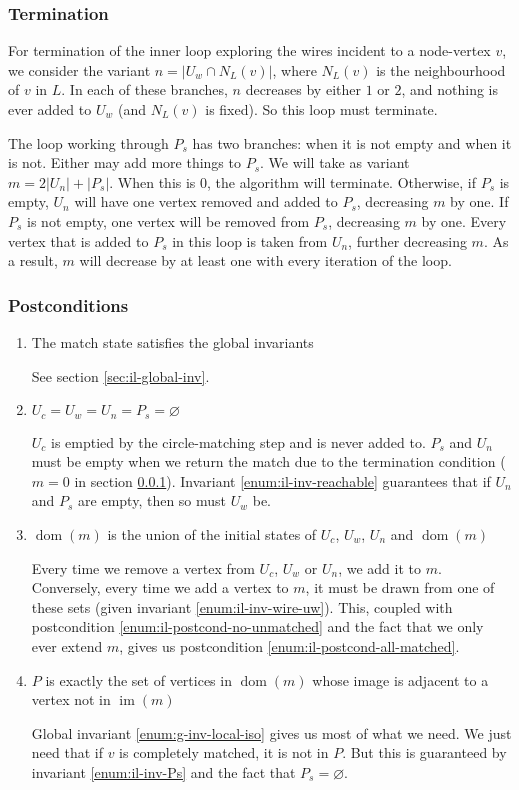 \documentclass{article}
\DeclareMathOperator{\dom}{dom}
\DeclareMathOperator{\im}{im}
\begin{document}
\subsubsection{Termination}
\label{sec:termination}

For termination of the inner loop exploring the wires incident to a node-vertex $v$, we consider the variant $n = |U_w\cap N_L(v)|$, where $N_L(v)$ is the neighbourhood of $v$ in $L$.  In each of these branches, $n$ decreases by either $1$ or $2$, and nothing is ever added to $U_w$ (and $N_L(v)$ is fixed).  So this loop must terminate.

The loop working through $P_s$ has two branches: when it is not empty and when it is not.  Either may add more things to $P_s$.  We will take as variant $m = 2|U_n| + |P_s|$.  When this is $0$, the algorithm will terminate.  Otherwise, if $P_s$ is empty, $U_n$ will have one vertex removed and added to $P_s$, decreasing $m$ by one.  If $P_s$ is not empty, one vertex will be removed from $P_s$, decreasing $m$ by one.  Every vertex that is added to $P_s$ in this loop is taken from $U_n$, further decreasing $m$.  As a result, $m$ will decrease by at least one with every iteration of the loop.

\subsubsection{Postconditions}

\begin{enumerate}
  \renewcommand{\theenumi}{(\Roman{enumi})}
  \renewcommand{\labelenumi}{\theenumi}
  \item The match state satisfies the global invariants

  See section \ref{sec:il-global-inv}.
  \item $U_c = U_w = U_n = P_s = \varnothing$

  $U_c$ is emptied by the circle-matching step and is never added to.  $P_s$ and $U_n$ must be empty when we return the match due to the termination condition ($m = 0$ in section \ref{sec:termination}).  Invariant \ref{enum:il-inv-reachable} guarantees that if $U_n$ and $P_s$ are empty, then so must $U_w$ be.
  \item $\dom(m)$ is the union of the initial states of $U_c$, $U_w$, $U_n$ and $\dom(m)$

  Every time we remove a vertex from $U_c$, $U_w$ or $U_n$, we add it to $m$.  Conversely, every time we add a vertex to $m$, it must be drawn from one of these sets (given invariant \ref{enum:il-inv-wire-uw}).  This, coupled with postcondition \ref{enum:il-postcond-no-unmatched} and the fact that we only ever extend $m$, gives us postcondition \ref{enum:il-postcond-all-matched}.

  \item $P$ is exactly the set of vertices in $\dom(m)$ whose image is adjacent to a vertex not in $\im(m)$

  Global invariant \ref{enum:g-inv-local-iso} gives us most of what we need.  We just need that if $v$ is completely matched, it is not in $P$.  But this is guaranteed by invariant \ref{enum:il-inv-Ps} and the fact that $P_s = \varnothing$.
\end{enumerate}
\end{document}
